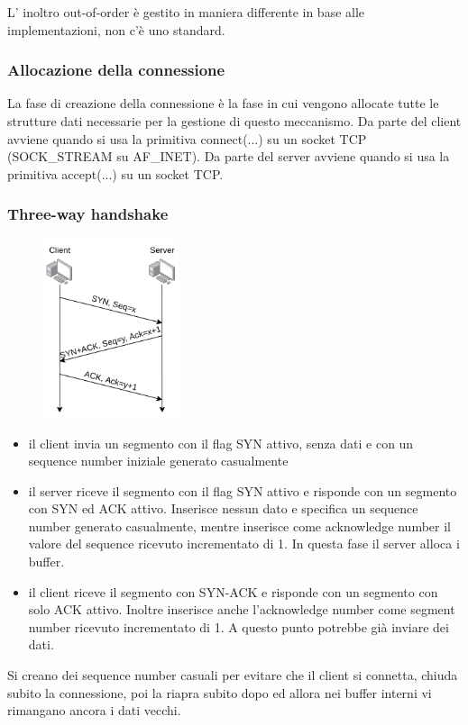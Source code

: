 L' inoltro out-of-order è gestito in maniera differente in base alle implementazioni, non c'è uno standard.

\subsubsection{Allocazione della connessione}
La fase di creazione della connessione è la fase in cui vengono allocate tutte le strutture dati necessarie per la gestione di questo meccanismo.
Da parte del client avviene quando si usa la primitiva connect(...) su un socket TCP (SOCK\_STREAM su AF\_INET).
Da parte del server avviene quando si usa la primitiva accept(...) su un socket TCP.

\subsubsection{Three-way handshake}
\begin{figure}[H]
    \centering
    \includegraphics[width=150px]{images/6_Trasporto/threeway_handshake.png}
\end{figure}

\begin{itemize}
    \item il client invia un segmento con il flag SYN attivo, senza dati e con un sequence number iniziale generato casualmente

    \item il server riceve il segmento con il flag SYN attivo e risponde con un segmento con SYN ed ACK attivo.
    Inserisce nessun dato e specifica un sequence number generato casualmente, mentre inserisce come acknowledge number il valore del sequence ricevuto incrementato di 1.
    In questa fase il server alloca i buffer.

    \item il client riceve il segmento con SYN-ACK  e risponde con un segmento con solo ACK attivo.
    Inoltre inserisce anche l'acknowledge number come segment number ricevuto incrementato di 1.
    A questo punto potrebbe già inviare dei dati.
\end{itemize}
Si creano dei sequence number casuali per evitare che il client si connetta, chiuda subito la connessione, poi la riapra subito dopo ed allora nei buffer interni vi rimangano ancora i dati vecchi.

